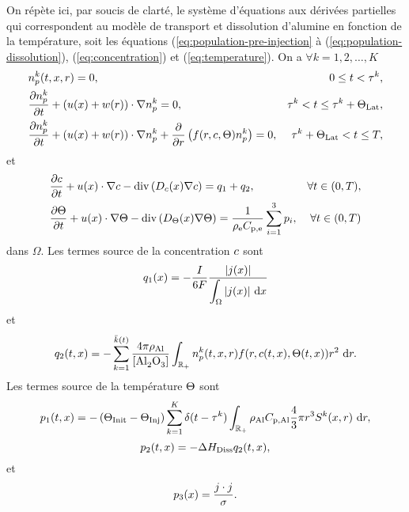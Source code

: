 On répète ici, par soucis de clarté, le système d'équations aux
dérivées partielles qui correspondent au modèle de transport et
dissolution d'alumine en fonction de la température, soit les
équations (\ref{eq:population-pre-injection} à
(\ref{eq:population-dissolution}), (\ref{eq:concentration}) et
(\ref{eq:temperature}). On a $\forall k = 1, 2, \dots, K$
\begin{align}
  & n_p^k(t, x, r) = 0,
  & 0\leq t < \tau^k,\label{eq:mdl-eq-1}\\
%
  & \frac{\partial n_p^k}{\partial t} + \parent{u(x) + w(r)}\cdot \nabla  n_p^k = 0,
  & \tau^k < t \leq \tau^k + \tlat,\label{eq:mdl-eq-2}\\
%
  & \frac{\partial n_p^k}{\partial t} + \parent{u(x) + w(r)}\cdot \nabla  n_p^k + \frac{\partial }{\partial r}\parent{f(r, \concentration, \temperature)n_p^k} = 0,
  & \tau^k + \tlat < t \leq \tend,\label{eq:mdl-eq-3}
\end{align}
et
\begin{align}
  & \frac{\partial \concentration}{\partial t} + u(x)\cdot\nabla \concentration - \div\parent{\cdiffusivity(x) \nabla \concentration} = q_1 + q_2,
  & \forall t\in (0, T),\label{eq:mdl-eq-4}\\
%
  & \frac{\partial \temperature}{\partial t} + u(x)\cdot\nabla\temperature - \div\parent{\electrolytetdiff(x)\nabla \temperature} = \frac{1}{\electrolytedensity\electrolytehc}\sum_{i = 1}^{3}p_i,
  & \forall t\in(0, T)\label{eq:mdl-eq-5}
\end{align}
dans $\Omega$. Les termes source de la concentration $c$ sont
\begin{equation}
  q_1(x) = -\frac{I}{6\faraday} %
  \frac{\abs{j(x)}}{\displaystyle\int_\Omega\abs{j(x)}\intd{x}}
\end{equation}
et
\begin{equation}
  q_2(t, x) = -\sum_{k = 1}^{\bar
    k(t)}\frac{4\pi\aluminadensity}{[\ce{Al2O3}]}\int_{\rplus}n_p^k(t,
  x, r)f(r, \concentration(t, x), \temperature(t, x))r^2\,\intd{r}.
\end{equation}
Les termes source de la température $\Theta$ sont
\begin{equation}
  p_1(t, x) = -\left( \Theta_\text{Init}-\Theta_\text{Inj} \right)\sum_{k = 1}^{K}\delta(t -
  \tau^k)\int_{\mathbb R_+}\rho_\mathrm{Al}C_{\mathrm{p,Al}}\frac{4}{3}\pi r^3 S^k(x, r)\,\,\mathrm dr,
\end{equation}
\begin{equation}
  p_2(t, x) = - \Delta H_\text{Diss} q_2(t, x),
\end{equation}
et
\begin{equation}
  p_3(x) = \frac{j\cdot j}{\sigma}.
\end{equation}

